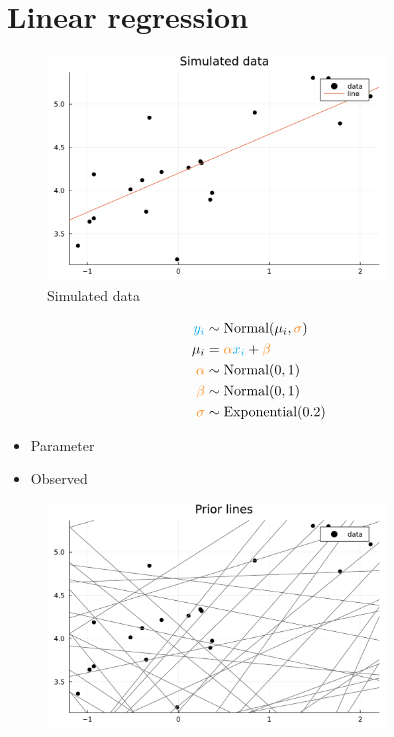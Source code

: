 \documentclass[aspectratio=169,xcolor=svgnames]{beamer}
\begin{document}
\section{Linear regression}

\begin{frame}
\begin{figure}[ht]
  \centering
  \includegraphics[width=0.8\textwidth]{figures/linear_data.pdf}
  \caption{\label{fig:label} Simulated data}
\end{figure}
\end{frame}

\begin{frame}
  \begin{align*}
    \textcolor{cyan}{y_i} &\sim \text{Normal}(\mu_i, \textcolor{orange}{\sigma})\\
    \mu_i &= \textcolor{orange}{\alpha} \textcolor{cyan}{x_i} + \textcolor{orange}{\beta}\\
    \textcolor{orange}{\alpha} &\sim \text{Normal}(0,1)\\
    \textcolor{orange}{\beta} &\sim \text{Normal}(0, 1)\\
    \textcolor{orange}{\sigma} &\sim \text{Exponential}(0.2)\\
  \end{align*}

  \begin{itemize}
  \item {} Parameter
  \item {} Observed
  \end{itemize}
\end{frame}

\begin{frame}
  \begin{figure}[ht]
    \centering
    \includegraphics[width=0.8\textwidth]{figures/linear_prior_lines.pdf}
  \end{figure}
\end{frame}
\end{document}
